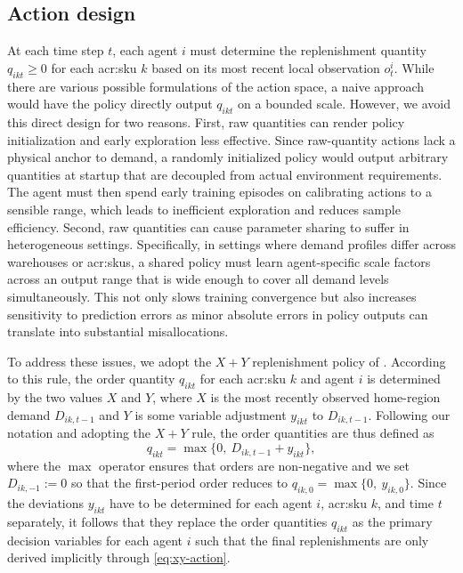 \subsection{Action design}
\label{subsec:action-design}
At each time step $t$, each agent $i$ must determine the replenishment quantity $q_{ikt} \ge 0$ for each \gls{acr:sku} $k$ based on its most recent local observation $o_{t}^{i}$. While there are various possible formulations of the action space, a naive approach would have the policy directly output $q_{ikt}$ on a bounded scale. However, we avoid this direct design for two reasons. First, raw quantities can render policy initialization and early exploration less effective. Since raw-quantity actions lack a physical anchor to demand, a randomly initialized policy would output arbitrary quantities at startup that are decoupled from actual environment requirements. The agent must then spend early training episodes on calibrating actions to a sensible range, which leads to inefficient exploration and reduces sample efficiency. Second, raw quantities can cause parameter sharing to suffer in heterogeneous settings. Specifically, in settings where demand profiles differ across warehouses or \glspl{acr:sku}, a shared policy must learn agent-specific scale factors across an output range that is wide enough to cover all demand levels simultaneously. This not only slows training convergence but also increases sensitivity to prediction errors as minor absolute errors in policy outputs can translate into substantial misallocations.

To address these issues, we adopt the $X+Y$ replenishment policy of \citep{kimbrough2002multiechelon, Preil2021}. According to this rule, the order quantity $q_{ikt}$ for each \gls{acr:sku} $k$ and agent $i$ is determined by the two values $X$ and $Y$, where $X$ is the most recently observed home-region demand $D_{ik,t-1}$ and $Y$ is some variable adjustment $y_{ikt}$ to $D_{ik,t-1}$. Following our notation and adopting the $X+Y$ rule, the order quantities are thus defined as 
\begin{equation}
\label{eq:xy-action}
  q_{ikt} = \max\!\big\{0,\ D_{ik,t-1} + y_{ikt}\big\},
\end{equation}
where the $\operatorname{max}$ operator ensures that orders are non-negative and we set $D_{ik,-1} := 0$ so that the first-period order reduces to $q_{ik,0} = \max\{0,\ y_{ik,0}\}$. Since the deviations $y_{ikt}$ have to be determined for each agent $i$, \gls{acr:sku} $k$, and time $t$ separately, it follows that they replace the order quantities $q_{ikt}$ as the primary decision variables for each agent $i$ such that the final replenishments are only derived implicitly through \autoref{eq:xy-action}.

